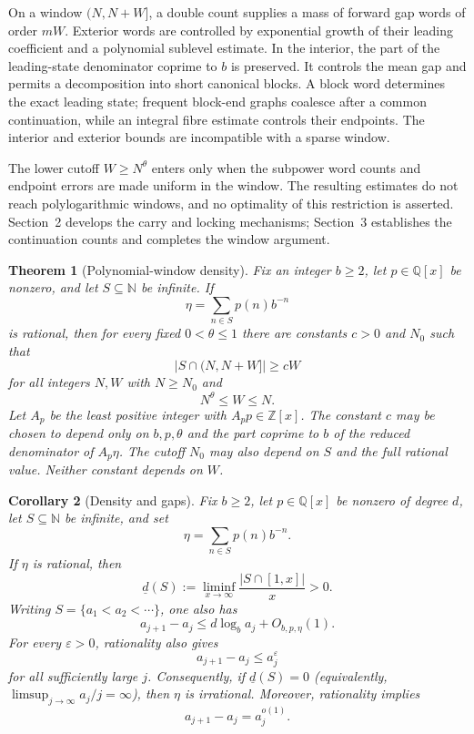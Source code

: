 \documentclass[a4paper,10pt]{amsart}
\newtheorem{theorem}{Theorem}[section]
\newtheorem{corollary}[theorem]{Corollary}
\theoremstyle{remark}
\newcommand{\N}{\mathbb N}
\newcommand{\Q}{\mathbb Q}
\newcommand{\Z}{\mathbb Z}
\begin{document}
On a window $(N,N+W]$, a double count supplies a mass of forward gap words of
order $mW$. Exterior words are controlled by exponential growth of their
leading coefficient and a polynomial sublevel estimate. In the interior,
the part of the leading-state denominator coprime to $b$ is preserved. It
controls the mean gap and permits a decomposition into short canonical
blocks. A block word determines the exact leading state; frequent block-end
graphs coalesce after a common continuation, while an integral fibre
estimate controls their endpoints. The interior and exterior bounds are
incompatible with a sparse window.

The lower cutoff $W\ge N^\theta$ enters only when the subpower word counts and
endpoint errors are made uniform in the window. The resulting estimates do
not reach polylogarithmic windows, and no optimality of this restriction is
asserted. Section~2 develops the carry and locking mechanisms; Section~3
establishes the continuation counts and completes the window argument.

\begin{theorem}[Polynomial-window density]\label{thm:main}
Fix an integer $b\ge2$, let $p\in\Q[x]$ be nonzero, and let
$S\subseteq\N$ be infinite.
If
\[
 \eta=\sum_{n\in S}p(n)b^{-n}
\]
is rational, then for every fixed $0<\theta\le1$ there are constants $c>0$
and $N_0$ such that
\[
 |S\cap(N,N+W]|\ge cW
\]
for all integers $N,W$ with $N\ge N_0$ and
\[
 N^\theta\le W\le N.
\]
Let $A_p$ be the least positive integer with $A_p p\in\Z[x]$. The constant
$c$ may be chosen to depend only on $b,p,\theta$ and the part coprime to $b$
of the reduced
denominator of $A_p\eta$. The cutoff $N_0$ may also depend on $S$ and the full
rational value. Neither constant depends on $W$.
\end{theorem}

\begin{corollary}[Density and gaps]\label{cor:erdos}
Fix $b\ge2$, let $p\in\Q[x]$ be nonzero of degree $d$, let
$S\subseteq\N$ be infinite, and set
\[
 \eta=\sum_{n\in S}p(n)b^{-n}.
\]
If $\eta$ is rational, then
\[
 \underline d(S):=\liminf_{x\to\infty}\frac{|S\cap[1,x]|}{x}>0.
\]
Writing $S=\{a_1<a_2<\cdots\}$, one also has
\[
 a_{j+1}-a_j\le d\log_ba_j+O_{b,p,\eta}(1).
\]
For every $\varepsilon>0$, rationality also gives
\[
 a_{j+1}-a_j\le a_j^\varepsilon
\]
for all sufficiently large $j$. Consequently, if
$\underline d(S)=0$ (equivalently,
$\limsup_{j\to\infty}a_j/j=\infty$), then $\eta$ is irrational.
Moreover, rationality implies
\[
 a_{j+1}-a_j=a_j^{o(1)}.
\]
\end{corollary}
\end{document}
